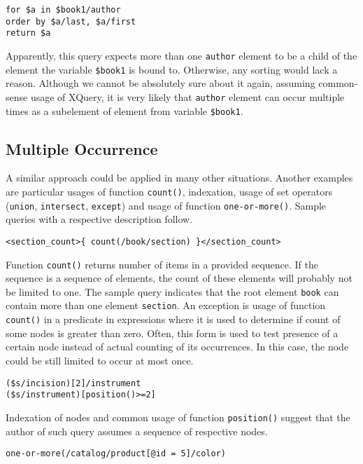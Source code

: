 \begin{verbatim}
for $a in $book1/author 
order by $a/last, $a/first
return $a
\end{verbatim}

Apparently, this query expects more than one \texttt{author} element to be a child of the element the variable \texttt{\$book1} is bound to. Otherwise, any sorting would lack a reason. Although we cannot be absolutely sure about it again, assuming common-sense usage of XQuery, it is very likely that \texttt{author} element can occur multiple times as a subelement of element from variable \texttt{\$book1}.

\subsection{Multiple Occurrence}
A similar approach could be applied in many other situations. Another examples are particular usages of function \texttt{count()}, indexation, usage of set operators (\texttt{union}, \texttt{intersect}, \texttt{except}) and usage of function \texttt{one-or-more()}. Sample queries with a respective description follow.

\begin{verbatim}
<section_count>{ count(/book/section) }</section_count>
\end{verbatim}

Function \texttt{count()} returns number of items in a provided sequence. If the sequence is a sequence of elements, the count of these elements will probably not be limited to one. The sample query indicates that the root element \texttt{book} can contain more than one element \texttt{section}.
An exception is usage of function \texttt{count()} in a predicate in expressions where it is used to determine if count of some nodes is greater than zero. Often, this form is used to test presence of a certain node instead of actual counting of its occurrences. In this case, the node could be still limited to occur at most once.

\begin{verbatim}
($s/incision)[2]/instrument
($s/instrument)[position()>=2]
\end{verbatim}

Indexation of nodes and common usage of function \texttt{position()} suggest that the author of such query assumes a sequence of respective nodes.

\begin{verbatim}
one-or-more(/catalog/product[@id = 5]/color)
\end{verbatim}


